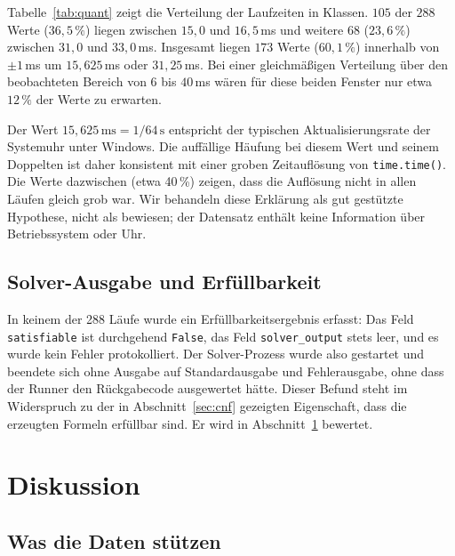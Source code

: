 \documentclass[a4paper,12pt]{article}
\theoremstyle{definition}
\newcommand{\resultsdir}{../src/results}
\begin{document}
Tabelle~\ref{tab:quant} zeigt die Verteilung der Laufzeiten in Klassen. $105$ der $288$ Werte ($36{,}5\,\%$) liegen zwischen $15{,}0$ und $16{,}5$\,ms und weitere $68$ ($23{,}6\,\%$) zwischen $31{,}0$ und $33{,}0$\,ms. Insgesamt liegen $173$ Werte ($60{,}1\,\%$) innerhalb von $\pm 1$\,ms um $15{,}625$\,ms oder $31{,}25$\,ms. Bei einer gleichmäßigen Verteilung über den beobachteten Bereich von $6$ bis $40$\,ms wären für diese beiden Fenster nur etwa $12\,\%$ der Werte zu erwarten.

Der Wert $15{,}625\,\mathrm{ms} = 1/64\,\mathrm{s}$ entspricht der typischen Aktualisierungsrate der Systemuhr unter Windows. Die auffällige Häufung bei diesem Wert und seinem Doppelten ist daher konsistent mit einer groben Zeitauflösung von \texttt{time.time()}. Die Werte dazwischen (etwa 40\,\%) zeigen, dass die Auflösung nicht in allen Läufen gleich grob war. Wir behandeln diese Erklärung als gut gestützte Hypothese, nicht als bewiesen; der Datensatz enthält keine Information über Betriebssystem oder Uhr.

\begin{table}[ht]
\centering\small

\caption{Häufigkeit der Laufzeiten in Klassen über alle 288 Läufe.}
\label{tab:quant}
\end{table}

\subsection{Solver-Ausgabe und Erfüllbarkeit}

In keinem der 288 Läufe wurde ein Erfüllbarkeitsergebnis erfasst: Das Feld \texttt{satisfiable} ist durchgehend \texttt{False}, das Feld \texttt{solver\_output} stets leer, und es wurde kein Fehler protokolliert. Der Solver-Prozess wurde also gestartet und beendete sich ohne Ausgabe auf Standardausgabe und Fehlerausgabe, ohne dass der Runner den Rückgabecode ausgewertet hätte. Dieser Befund steht im Widerspruch zu der in Abschnitt~\ref{sec:cnf} gezeigten Eigenschaft, dass die erzeugten Formeln erfüllbar sind. Er wird in Abschnitt~\ref{sec:diskussion} bewertet.

\section{Diskussion}
\label{sec:diskussion}

\subsection{Was die Daten stützen}
\end{document}
